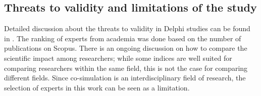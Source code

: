\subsection{Threats to validity and limitations of the study}
Detailed discussion about the threats to validity in Delphi studies can be found in \cite{Hasson2000}.
The ranking of experts from academia was done based on the number of publications on Scopus\trademark.
There is an ongoing discussion on how to compare the scientific impact among researchers; while some indices are well suited for comparing researchers within the same field, this is not the case for comparing different fields. Since co-simulation is an interdisciplinary field of research, the selection of experts in this work can be seen as a limitation. 





